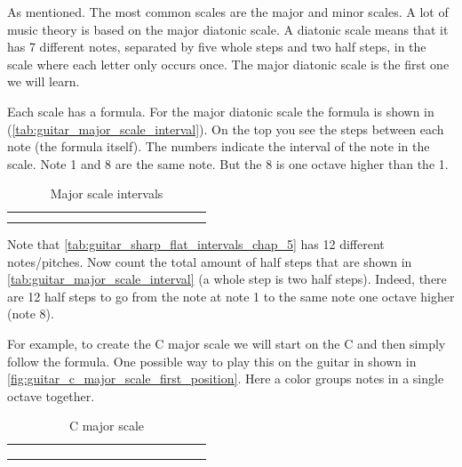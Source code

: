 As mentioned. The most common scales are the major and minor scales. A lot of music theory is based on the major diatonic scale. A diatonic scale means that it has 7 different notes, separated by five whole steps and two half steps, in the scale where each letter only occurs once. The major diatonic scale is the first one we will learn.

Each scale has a formula. For the major diatonic scale the formula is shown in (\autoref{tab:guitar_major_scale_interval}). On the top you see the steps between each note (the formula itself). The numbers indicate the interval of the note in the scale. Note 1 and 8 are the same note. But the 8 is one octave higher than the 1.

\begin{table}[h]
	\centering
	\begin{NiceTabular}{*{16}{P{0.05mm}}}
		\Block{}{} &  & &  & &  & &  & &  & &  & &  & & \Block{}{} \\
		 & &  & &  & &  & &  & &  & &  & &  &
	\end{NiceTabular}
	\caption{Major scale intervals}
	\label{tab:guitar_major_scale_interval}
\end{table}

Note that \autoref{tab:guitar_sharp_flat_intervals_chap_5} has 12 different notes/pitches. Now count the total amount of half steps that are shown in \autoref{tab:guitar_major_scale_interval} (a whole step is two half steps). Indeed, there are 12 half steps to go from the note at note 1 to the same note one octave higher (note 8).

For example, to create the C major scale we will start on the C and then simply follow the formula. One possible way to play this on the guitar in shown in \autoref{fig:guitar_c_major_scale_first_position}. Here a color groups notes in a single octave together.

\begin{table}[h]
	\centering
	\begin{NiceTabular}{*{16}{P{0.05mm}}}
		\Block{}{} &  & &  & &  & &  & &  & &  & &  & & \Block{}{} \\
		 & &  & &  & &  & &  & &  & &  & &  & \\
		 & &  & &  & &  & &  & &  & &  & &  & 
	\end{NiceTabular}
	\caption{C major scale}
	\label{tab:guitar_c_major_scale}
\end{table}


